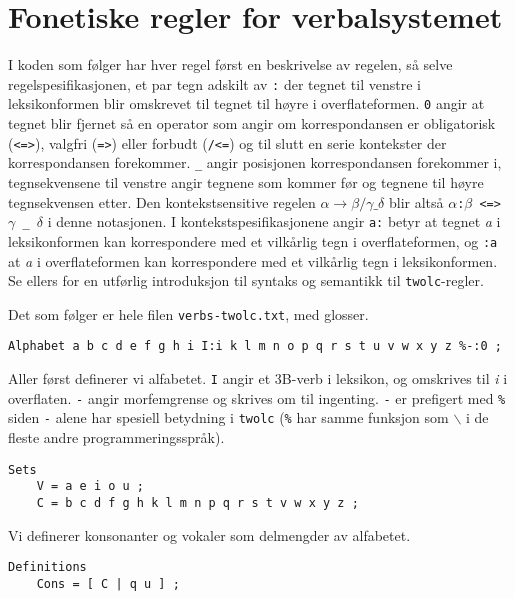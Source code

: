 \documentclass{article}
\let\code\texttt
\let\prog\texttt
\let\w\emph
\begin{document}
\section{Fonetiske regler for verbalsystemet}
\label{verbphon}
I koden som f\o{}lger har hver regel f\o{}rst en beskrivelse av regelen,
s\aa{} selve regelspesifikasjonen, et par tegn adskilt av \code{:} der tegnet
til venstre i leksikonformen blir omskrevet til tegnet til h\o{}yre i
overflateformen. \code{0} angir at tegnet blir fjernet s\aa{} en operator som
angir om korrespondansen er obligatorisk (\code{<=>}), valgfri (\code{=>})
eller forbudt (\code{/<=}) og til slutt en serie kontekster der
korrespondansen forekommer. \code{\_} angir posisjonen korrespondansen
forekommer i, tegnsekvensene til venstre angir tegnene som kommer f\o{}r og
tegnene til h\o{}yre tegnsekvensen etter. Den kontekstsensitive regelen
$\alpha \to \beta/\gamma \_ \delta$ blir alts\aa{} \code{$\alpha$:$\beta$ <=>
$\gamma$ \_ $\delta$} i denne notasjonen. I kontekstspesifikasjonene angir
\code{a:} betyr at tegnet \w{a} i leksikonformen kan korrespondere med et
vilk\aa{}rlig tegn i overflateformen, og \code{:a} at \w{a} i overflateformen
kan korrespondere med et vilk\aa{}rlig tegn i leksikonformen. Se ellers
 for en utf\o{}rlig introduksjon til syntaks og semantikk til
\prog{twolc}-regler.

Det som f\o{}lger er hele filen \code{verbs-twolc.txt}, med glosser.

\lstset{basicstyle=\small,numbers=left}
\begin{lstlisting}[name=verbs-twolc.txt]
Alphabet a b c d e f g h i I:i k l m n o p q r s t u v w x y z %-:0 ;
\end{lstlisting}

Aller f\o{}rst definerer vi alfabetet. \code{I} angir et 3B-verb i leksikon,
og omskrives til \w{i} i overflaten. \code{-} angir morfemgrense og skrives om
til ingenting. \code{-} er prefigert med \code{\%} siden \code{-} alene har
spesiell betydning i \prog{twolc} (\code{\%} har samme funksjon som
$\backslash$ i de fleste andre programmeringsspr\aa{}k).

\begin{lstlisting}[name=verbs-twolc.txt]
Sets
    V = a e i o u ;
    C = b c d f g h k l m n p q r s t v w x y z ;
\end{lstlisting}

Vi definerer konsonanter og vokaler som delmengder av alfabetet.

\begin{lstlisting}[name=verbs-twolc.txt]
Definitions
    Cons = [ C | q u ] ;
\end{lstlisting}
\end{document}
